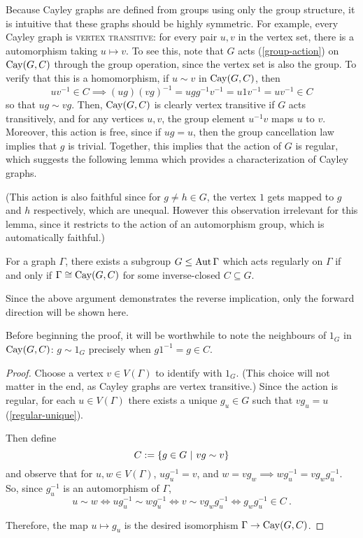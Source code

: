 \documentclass{report}
\begin{document}
    Because Cayley graphs are defined from groups using only the group
    structure, it is intuitive that these graphs should be highly symmetric.
    For example, every Cayley graph is \textsc{vertex transitive}: for every
    pair $u, v$ in the vertex set, there is a automorphism taking $u \mapsto v$.
    To see this, note that $G$ acts (\ref{group-action}) on $\operatorname{Cay}(G, C)$ through
    the group operation, since the vertex set is also the group.
    To verify that this is a homomorphism, if $u \sim v$ in $\operatorname{Cay}(G, C)$, then
    $$
      uv^{-1} \in C
      \implies (ug)(vg)^{-1} = ugg^{-1}v^{-1} = u 1 v^{-1} = u v^{-1} \in C
    $$
    so that $ug \sim vg$.
    Then, $\operatorname{Cay}(G, C)$ is clearly vertex transitive if $G$ acts transitively,
    and for any vertices $u, v$, the group element $u^{-1} v$ maps $u$ to $v$.
    Moreover, this action is free, since if $ug = u$, then the group
    cancellation law implies that $g$ is trivial.
    Together, this implies that the action of $G$ is regular,
    which suggests the following lemma which provides a characterization of
    Cayley graphs.

    (This action is also faithful since for $g \neq h \in G$, the vertex $1$
    gets mapped to $g$ and $h$ respectively, which are unequal.  However this
    observation irrelevant for this lemma, since it restricts to the action of
    an automorphism group, which is automatically faithful.)

    \begin{lem}\label{regular-aut-cayley}
      For a graph $\Gamma$, there exists a subgroup $G \leq \operatorname{Aut} \Gamma$
      which acts regularly on $\Gamma$
      if and only if $\Gamma \cong \operatorname{Cay}(G, C)$
      for some inverse-closed $C \subseteq G$.
    \end{lem}

    Since the above argument demonstrates the reverse implication,
    only the forward direction will be shown here.

    Before beginning the proof, it will be worthwhile to note the neighbours
    of $1_G$ in $\operatorname{Cay}(G, C)$: $g \sim 1_G$ precisely when $g1^{-1} = g \in C$.

    \begin{proof}
      Choose a vertex $v \in V(\Gamma)$ to identify with $1_G$.  (This choice
      will not matter in the end, as Cayley graphs are vertex transitive.)
      Since the action is regular, for each $u \in V(\Gamma)$ there exists a
      unique $g_u \in G$ such that $vg_u = u$ (\ref{regular-unique}).

      Then define
      $$
        C := \left\lbrace  g \in G \ \middle| \ vg \sim v  \right\rbrace
      $$
      and observe that for $u, w \in V(\Gamma)$,
      $u g_u^{-1} = v$, and $w = v g_w \implies w g_u^{-1} = v g_w g_u^{-1}$.
      So, since $g_u^{-1}$ is an automorphism of $\Gamma$,
      $$
        u \sim w
        \iff u g_u^{-1} \sim w g_u^{-1}
        \iff v \sim v g_w g_u^{-1}
        \iff g_w g_u^{-1} \in C
        \ .
      $$

      Therefore, the map $u \mapsto g_u$ is the desired isomorphism $\Gamma \to
      \operatorname{Cay}(G, C)$.
    \end{proof}
\end{document}
